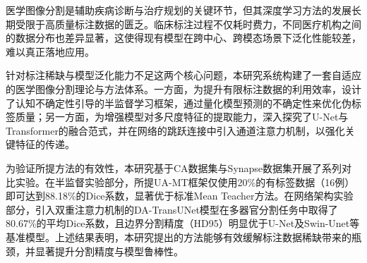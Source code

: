 医学图像分割是辅助疾病诊断与治疗规划的关键环节，但其深度学习方法的发展长期受限于高质量标注数据的匮乏。临床标注过程不仅耗时费力，不同医疗机构之间的数据分布也差异显著，这使得现有模型在跨中心、跨模态场景下泛化性能较差，难以真正落地应用。

针对标注稀缺与模型泛化能力不足这两个核心问题，本研究系统构建了一套自适应的医学图像分割理论与方法体系。一方面，为提升有限标注数据的利用效率，设计了认知不确定性引导的半监督学习框架，通过量化模型预测的不确定性来优化伪标签质量；另一方面，为增强模型对多尺度特征的提取能力，深入探究了U-Net与Transformer的融合范式，并在网络的跳跃连接中引入通道注意力机制，以强化关键特征的传递。

为验证所提方法的有效性，本研究基于CA数据集与Synapse数据集开展了系列对比实验。在半监督实验部分，所提UA-MT框架仅使用20\%的有标签数据（16例）即可达到88.18\%的Dice系数，显著优于标准Mean Teacher方法。在网络架构实验部分，引入双重注意力机制的DA-TransUNet模型在多器官分割任务中取得了80.67\%的平均Dice系数，且边界分割精度（HD95）明显优于U-Net及Swin-Unet等基准模型。上述结果表明，本研究提出的方法能够有效缓解标注数据稀缺带来的瓶颈，并显著提升分割精度与模型鲁棒性。